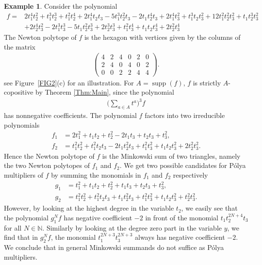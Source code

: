 \documentclass[a4paper,11pt]{amsart}
\theoremstyle{definition}
\newtheorem{example}[theorem]{Example}
\DeclareMathOperator{\supp}{supp}
\newcommand{\NN}{\mathbb{N}}
\begin{document}
\begin{example}
\label{Ex:MinkowskiSum}
     Consider the polynomial \begin{align*}
f=&2t_1^4t_2^2+t_1^3t_2^3+t_1^2t_2^4+2t_1^4t_2t_3-5t_1^3t_2^2t_3-2t_1t_2^4t_3+2t_1^4t_3^2+t_1^3t_2t_3^2+12t_1^2t_2^2t_3^2+t_1t_2^3t_3^2\\&+2t_2^4t_3^2-2t_1^3t_3^3-5t_1t_2^2t_3^3+2t_2^3t_3^3+t_1^2t_3^4+t_1t_2t_3^4+2t_2^2t_3^4
     \end{align*}
The Newton polytope of $f$ is the hexagon with vertices given by the columns of the matrix \begin{align*}
    \begin{pmatrix}
         4 & 2 & 4 & 0 & 2 & 0 \\ 2 & 4 & 0 & 4 & 0 & 2 \\ 0 & 0 & 2 & 2 & 4 & 4
    \end{pmatrix}.
\end{align*}
see Figure~\ref{FIG2}(c) for an illustration.
For $A = \supp(f)$, $f$ is strictly $A$-copositive by Theorem \ref{Thm:Main}, since the polynomial\begin{align*}
    \Big(\sum_{a\in A}t^a\Big)^3f
\end{align*}
has nonnegative coefficients.
The polynomial $f$ factors into two irreducible polynomials\begin{align*}
    f_1&=2t_1^2+t_1t_2+t_2^2-2t_1t_3+t_2t_3+t_3^2, \\
    f_2&=t_1^2t_2^2+t_1^2t_2t_3-2t_1t_2^2t_3+t_1^2t_3^2+t_1t_2t_3^2+2t_2^2t_3^2.
\end{align*}
Hence the Newton polytope of $f$ is the Minkowski sum of two triangles, namely the two Newton polytopes of $f_1$ and $f_2$. We get two possible candidates for Pólya multipliers of $f$ by summing the monomials in $f_1$ and $f_2$ respectively \begin{align*}
    g_1&=t_1^2+t_1t_2+t_2^2+t_1t_3+t_2t_3+t_3^2, \\
    g_2&=t_1^2t_2^2+t_1^2t_2t_3+t_1t_2^2t_3+t_1^2t_3^2+t_1t_2t_3^2+t_2^2t_3^2.
\end{align*}
However, by looking at the highest degree in the variable $t_2$, we easily see that the polynomial $g_1^Nf$ has negative coefficient $-2$ in front of the monomial $t_1t_2^{2N+4}t_3$ for all $N\in \NN$. Similarly by looking at the degree zero part in the variable $y$, we find that in $g_2^Nf$, the monomial $t_1^{2N+3}t_3^{2N+3}$ always has negative coefficient $-2$. We conclude that in general Minkowski summands do not suffice as Pólya multipliers.
\end{example}
\end{document}
